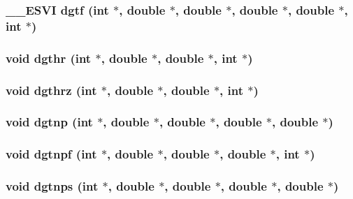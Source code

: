 \subsubsection{\setlength{\rightskip}{0pt plus 5cm}\_\-\_\-ESVI dgtf (int $\ast$, double $\ast$, double $\ast$, double $\ast$, double $\ast$, int $\ast$)}\label{essl_8h_811412b3d84c1cc350fd28138d099a56}


\subsubsection{\setlength{\rightskip}{0pt plus 5cm}void dgthr (int $\ast$, double $\ast$, double $\ast$, int $\ast$)}\label{essl_8h_b9eca9ae224cb50dc1e1ffba05011390}


\subsubsection{\setlength{\rightskip}{0pt plus 5cm}void dgthrz (int $\ast$, double $\ast$, double $\ast$, int $\ast$)}\label{essl_8h_a450a9766f5e9da2f3c03252205e9112}


\subsubsection{\setlength{\rightskip}{0pt plus 5cm}void dgtnp (int $\ast$, double $\ast$, double $\ast$, double $\ast$, double $\ast$)}\label{essl_8h_39e698f6a0466b330ae3d133971a0956}


\subsubsection{\setlength{\rightskip}{0pt plus 5cm}void dgtnpf (int $\ast$, double $\ast$, double $\ast$, double $\ast$, int $\ast$)}\label{essl_8h_7a7c8186ce75c9445ab708c492b6a5e9}


\subsubsection{\setlength{\rightskip}{0pt plus 5cm}void dgtnps (int $\ast$, double $\ast$, double $\ast$, double $\ast$, double $\ast$)}\label{essl_8h_812e7098c3f50610615f80bb0e45527f}


